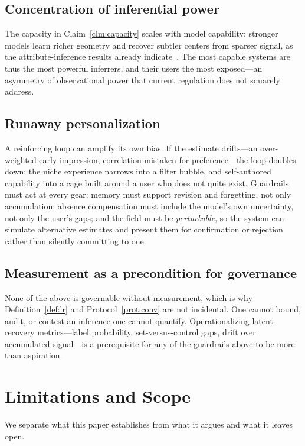 \documentclass[conference]{IEEEtran}
\theoremstyle{definition}
\begin{document}
\subsection{Concentration of inferential power}
The capacity in Claim~\ref{clm:capacity} scales with model capability: stronger models learn richer geometry and recover subtler centers from sparser signal, as the attribute-inference results already indicate~\cite{staab2024beyond}. The most capable systems are thus the most powerful inferrers, and their users the most exposed---an asymmetry of observational power that current regulation does not squarely address.

\subsection{Runaway personalization}
A reinforcing loop can amplify its own bias. If the estimate drifts---an over-weighted early impression, correlation mistaken for preference---the loop doubles down: the niche experience narrows into a filter bubble, and self-authored capability into a cage built around a user who does not quite exist. Guardrails must act at every gear: memory must support revision and forgetting, not only accumulation; absence compensation must include the model's own uncertainty, not only the user's gaps; and the field must be \emph{perturbable}, so the system can simulate alternative estimates and present them for confirmation or rejection rather than silently committing to one.

\subsection{Measurement as a precondition for governance}
None of the above is governable without measurement, which is why Definition~\ref{def:lr} and Protocol~\ref{prot:conv} are not incidental. One cannot bound, audit, or contest an inference one cannot quantify. Operationalizing latent-recovery metrics---label probability, set-versus-control gaps, drift over accumulated signal---is a prerequisite for any of the guardrails above to be more than aspiration.

\section{Limitations and Scope}
\label{sec:limits}

We separate what this paper establishes from what it argues and what it leaves open.
\end{document}
